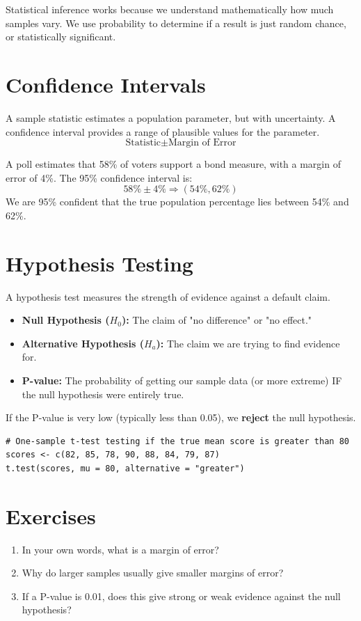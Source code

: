 \documentclass[11pt,openany]{book}
\begin{document}
\begin{bigidea}
Statistical inference works because we understand mathematically how much samples vary. We use probability to determine if a result is just random chance, or statistically significant.
\end{bigidea}

\section{Confidence Intervals}
A sample statistic estimates a population parameter, but with uncertainty. A confidence interval provides a range of plausible values for the parameter.
\[
\text{Statistic} \pm \text{Margin of Error}
\]

\begin{examplebox}
A poll estimates that 58\% of voters support a bond measure, with a margin of error of 4\%.
The 95\% confidence interval is:
\[
58\% \pm 4\% \Rightarrow (54\%, 62\%)
\]
We are 95\% confident that the true population percentage lies between 54\% and 62\%.
\end{examplebox}

\section{Hypothesis Testing}
A hypothesis test measures the strength of evidence against a default claim.
\begin{itemize}
    \item \textbf{Null Hypothesis ($H_0$):} The claim of "no difference" or "no effect."
    \item \textbf{Alternative Hypothesis ($H_a$):} The claim we are trying to find evidence for.
    \item \textbf{P-value:} The probability of getting our sample data (or more extreme) IF the null hypothesis were entirely true.
\end{itemize}
If the P-value is very low (typically less than 0.05), we \textbf{reject} the null hypothesis.

\begin{rstudio}
\begin{lstlisting}[style=rcode]
# One-sample t-test testing if the true mean score is greater than 80
scores <- c(82, 85, 78, 90, 88, 84, 79, 87)
t.test(scores, mu = 80, alternative = "greater")
\end{lstlisting}
\end{rstudio}

\section{Exercises}
\begin{enumerate}
    \item In your own words, what is a margin of error?
    \item Why do larger samples usually give smaller margins of error?
    \item If a P-value is 0.01, does this give strong or weak evidence against the null hypothesis?
\end{enumerate}
\end{document}
